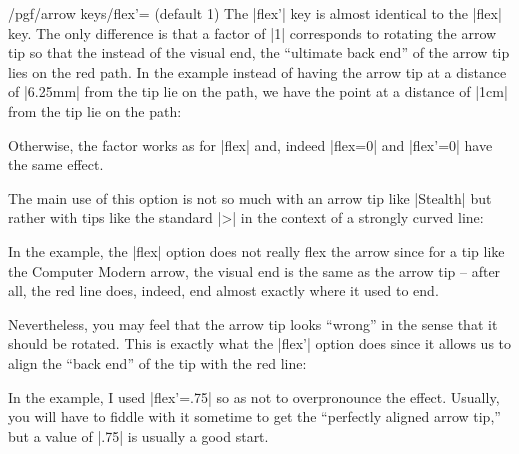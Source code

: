 \begin{key}{/pgf/arrow keys/flex'= (default 1)}
  The |flex'| key is almost identical to the |flex| key. The only
  difference is that a factor of |1| corresponds to rotating the arrow
  tip so that the instead of the visual end, the ``ultimate back end''
  of the arrow tip lies on the red path. In the example instead of
  having the arrow tip at a distance of |6.25mm| from the tip lie on
  the path, we have the point at a distance of |1cm| from the tip lie
  on the path:
\begin{codeexample}[]
\end{codeexample}
  Otherwise, the factor works as for |flex| and, indeed |flex=0| and
  |flex'=0| have the same effect.

  The main use of this option is not so much with an arrow tip like
  |Stealth| but rather with tips like the standard |>| in the context
  of a strongly curved line:
\begin{codeexample}[]
\end{codeexample}
  In the example, the |flex| option does not really flex the arrow
  since for a tip like the Computer Modern arrow, the visual end is
  the same as the arrow tip -- after all, the red line does, indeed, end
  almost exactly where it used to end.

  Nevertheless, you may feel that the arrow tip looks ``wrong'' in the sense that it
  should be rotated. This is exactly what the |flex'| option does
  since it allows us to align the ``back end'' of the tip with the red line:
\begin{codeexample}[]
\end{codeexample}
  In the example, I used |flex'=.75| so as not to overpronounce the
  effect. Usually, you will have to fiddle with it sometime to get the
  ``perfectly aligned arrow tip,'' but a value of |.75| is usually a
  good start.
\end{key}



